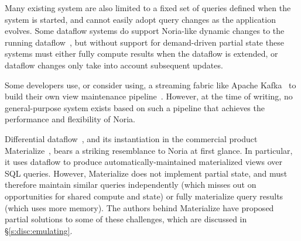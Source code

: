 Many existing system are also limited to a fixed set of queries defined when the
system is started, and cannot easily adopt query changes as the application
evolves. Some dataflow systems do support Noria-like dynamic changes to the
running dataflow~\cite{ciel, ray}, but without support for demand-driven partial
state these systems must either fully compute results when the dataflow is
extended, or dataflow changes only take into account subsequent updates.

Some developers use, or consider using, a streaming fabric like Apache
Kafka~\cite{kafka} to build their own view maintenance pipeline~\cite{nyt-kafka,
samza-blogpost}. However, at the time of writing, no general-purpose system
exists based on such a pipeline that achieves the performance and flexibility of
Noria.

Differential dataflow~\cite{differential-dataflow}, and its instantiation in the
commercial product Materialize~\cite{materialize}, bears a striking resemblance
to Noria at first glance. In particular, it uses dataflow to produce
automatically-maintained materialized views over SQL queries. However,
Materialize does not implement partial state, and must therefore maintain
similar queries independently (which misses out on opportunities for shared
compute and state) or fully materialize query results (which uses more memory).
The authors behind Materialize have proposed partial solutions to some of these
challenges, which are discussed in \S\vref{s:disc:emulating}.
